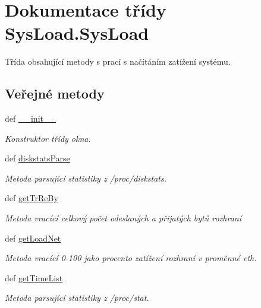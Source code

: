 \hypertarget{classSysLoad_1_1SysLoad}{\section{Dokumentace třídy Sys\-Load.\-Sys\-Load}
\label{d0/d3a/classSysLoad_1_1SysLoad}
}


Třída obsahující metody s prací s načítáním zatížení systému.  


\subsection*{Veřejné metody}
\begin{DoxyCompactItemize}
\item 
def \hyperlink{classSysLoad_1_1SysLoad_a7e00bec18d33f1bf3ab7a214597ddf6f}{\-\_\-\-\_\-init\-\_\-\-\_\-}
\begin{DoxyCompactList}\small\item\em Konstruktor třídy okna. \end{DoxyCompactList}\item 
def \hyperlink{classSysLoad_1_1SysLoad_a9c6e924af991784ea7603995e6df4790}{diskstats\-Parse}
\begin{DoxyCompactList}\small\item\em Metoda parsující statistiky z /proc/diskstats. \end{DoxyCompactList}\item 
def \hyperlink{classSysLoad_1_1SysLoad_a7540932700db54f5a564f3fd5ba6ef54}{get\-Tr\-Re\-By}
\begin{DoxyCompactList}\small\item\em Metoda vracící celkový počet odeslaných a přijatých bytů rozhraní \end{DoxyCompactList}\item 
def \hyperlink{classSysLoad_1_1SysLoad_ab68faaad3b50152a2ebc1f352d795d8f}{get\-Load\-Net}
\begin{DoxyCompactList}\small\item\em Metoda vracící 0-\/100 jako procento zatížení rozhraní v proměnné eth. \end{DoxyCompactList}\item 
def \hyperlink{classSysLoad_1_1SysLoad_a72febde2af89e56afa589d4c15fa4e72}{get\-Time\-List}
\begin{DoxyCompactList}\small\item\em Metoda parsující statistiky z /proc/stat. \end{DoxyCompactList}\item 

\end{DoxyCompactItemize}
